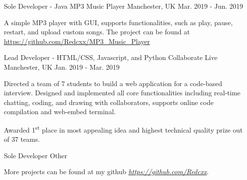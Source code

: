 \begin{cventries}
  \cventry
  {Sole Developer - Java} %
  {MP3 Music Player} %
  {Manchester, UK} %
  {Mar. 2019 - Jun. 2019} %
  {
    \begin{cvitems} %
      \item {A simple MP3 player with GUI, supports functionalities, such as play, pause, restart, and upload custom songs. The project can be found at \href{https://github.com/Redcxx/MP3_Music_Player}{https://github.com/Redcxx/MP3\_Music\_Player}}
    \end{cvitems}
  }


  \cventry
    {Lead Developer - HTML/CSS, Javascript, and Python} %
    {Collaborate Live} %
    {Manchester, UK} %
    {Jan. 2019 - Mar. 2019} %
    {
      \begin{cvitems} %
        \item {Directed a team of 7 students to build a web application for a code-based interview. Designed and implemented all core functionalities including real-time chatting, coding, and drawing with collaborators, supports online code compilation and web-embed terminal.}
        \item {Awarded 1\textsuperscript{st} place in most appealing idea and highest technical quality prize out of 37 teams.}
      \end{cvitems}
    }


  


\cventry
{Sole Developer} %
{Other} %
{} %
{} %
{
  \begin{cvitems} %
    \item {More projects can be found at my github \href{https://github.com/Redcxx}{\textit{https://github.com/Redcxx}}.}
  \end{cvitems}
}


\end{cventries}
